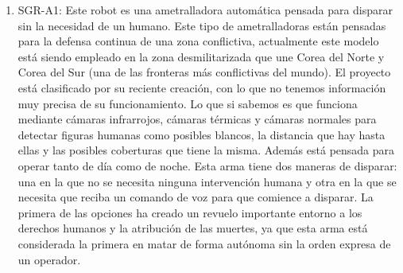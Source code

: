 \begin{enumerate}
  \item SGR-A1: Este robot es una ametralladora automática pensada para disparar sin la necesidad de un humano. Este tipo de ametralladoras están pensadas para la defensa continua de una zona conflictiva, actualmente este modelo está siendo empleado en la zona desmilitarizada que une Corea del Norte y Corea del Sur (una de las fronteras más conflictivas del mundo). El proyecto está clasificado por su reciente creación, con lo que no tenemos información muy precisa de su funcionamiento. Lo que si sabemos es que funciona mediante cámaras infrarrojos, cámaras térmicas y cámaras normales para detectar figuras humanas como posibles blancos, la distancia que hay hasta ellas y las posibles coberturas que tiene la misma. Además está pensada para operar tanto de día como de noche. Esta arma tiene dos maneras de disparar: una en la que no se necesita ninguna intervención humana y otra en la que se necesita que reciba un comando de voz para que comience a disparar. La primera de las opciones ha creado un revuelo importante entorno a los derechos humanos y la atribución de las muertes, ya que esta arma está considerada la primera en matar de forma autónoma sin la orden expresa de un operador. 
\end{enumerate}
